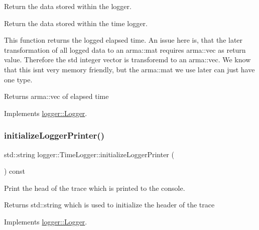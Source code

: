 Return the data stored within the logger. 

Return the data stored within the time logger.

This function returns the logged elapsed time. An issue here is, that the later transformation of all logged data to an {\ttfamily arma\+::mat} requires {\ttfamily arma\+::vec} as return value. Therefore the std integer vector is transforemd to an {\ttfamily arma\+::vec}. We know that this isn\textquotesingle{}t very memory friendly, but the {\ttfamily arma\+::mat} we use later can just have one type.

\begin{DoxyReturn}{Returns}
{\ttfamily arma\+::vec} of elapsed time 
\end{DoxyReturn}


Implements \mbox{\hyperlink{classlogger_1_1_logger_aa4fc254c532172db3404b7c0bcd17092}{logger\+::\+Logger}}.

\mbox{\label{classlogger_1_1_time_logger_a60f041a21157b1049f512d325c3d35ac}} 
\subsubsection{\texorpdfstring{initialize\+Logger\+Printer()}{initializeLoggerPrinter()}}
{\footnotesize\ttfamily std\+::string logger\+::\+Time\+Logger\+::initialize\+Logger\+Printer (\begin{DoxyParamCaption}{ }\end{DoxyParamCaption}) const\hspace{0.3cm}{\ttfamily [virtual]}}



Print the head of the trace which is printed to the console. 

\begin{DoxyReturn}{Returns}
{\ttfamily std\+::string} which is used to initialize the header of the trace 
\end{DoxyReturn}


Implements \mbox{\hyperlink{classlogger_1_1_logger_a825f96e8564ac4013ff09ef842c0aeec}{logger\+::\+Logger}}.

\mbox{\label{classlogger_1_1_time_logger_a9498311652805868b5a0ea7f5480f0be}} 
